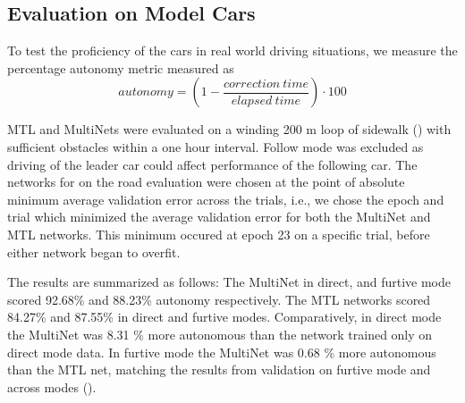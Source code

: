 
\subsection{Evaluation on Model Cars}

To test the proficiency of the cars in real world driving situations, we measure the percentage autonomy metric \cite{bojarski2016end} measured as
\begin{equation}
    autonomy = (1 - \dfrac{correction\ time}{elapsed\ time}) \cdot 100
   \label{eq:autonomy}
\end{equation}

MTL and MultiNets were evaluated on a winding 200 m loop of sidewalk () with sufficient obstacles within a one hour interval. Follow mode was excluded as driving of the leader car could affect performance of the following car. The networks for on the road evaluation were chosen at the point of absolute minimum average validation error across the trials, i.e., we chose the epoch and trial which minimized the average validation error for both the MultiNet and MTL networks. This minimum occured at epoch 23 on a specific trial, before either network began to overfit. 

The results are summarized as follows: The MultiNet in direct, and furtive mode scored 92.68\% and 88.23\% autonomy respectively. The MTL networks scored 84.27\% and 87.55\% in direct and furtive modes. Comparatively, in direct mode the MultiNet was 8.31 \% more autonomous than the network trained only on direct mode data. In furtive mode the MultiNet was 0.68 \% more autonomous than the MTL net, matching the results from validation on furtive mode and across modes ().
